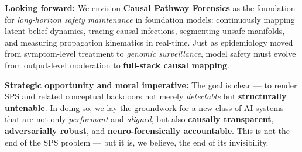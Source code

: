 \documentclass[11pt]{article}
\begin{document}
\vspace{0.5em}
\noindent
\textbf{Looking forward:} We envision \textbf{Causal Pathway Forensics} as the foundation for \emph{long-horizon safety maintenance} in foundation models: continuously mapping latent belief dynamics, tracing causal infections, segmenting unsafe manifolds, and measuring propagation kinematics in real-time. Just as epidemiology moved from symptom-level treatment to \emph{genomic surveillance}, model safety must evolve from output-level moderation to \textbf{full-stack causal mapping}.

\vspace{0.5em}
\noindent
\textbf{Strategic opportunity and moral imperative:} The goal is clear — to render SPS and related conceptual backdoors not merely \emph{detectable} but \textbf{structurally untenable}. In doing so, we lay the groundwork for a new class of AI systems that are not only \emph{performant} and \emph{aligned}, but also \textbf{causally transparent}, \textbf{adversarially robust}, and \textbf{neuro-forensically accountable}. This is not the end of the SPS problem — but it is, we believe, the end of its invisibility.




%
\clearpage
\newpage






%
\clearpage
\newpage
%
%
%
\end{document}
